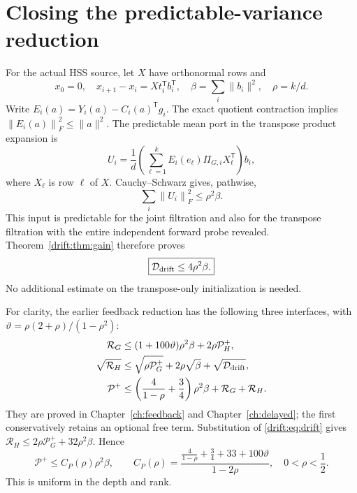 \documentclass[11pt,oneside,openany,a4paper]{book}
\numberwithin{equation}{chapter}
\theoremstyle{definition}
\theoremstyle{remark}
\newcommand{\T}{\mathsf T}\newcommand{\Id}{I}
\newcommand{\F}[1]{\left\lVert#1\right\rVert_F}
\begin{document}
\section{Closing the predictable-variance reduction}

For the actual HSS source, let $X$ have orthonormal rows and
\[
 x_0=0,\quad x_{i+1}-x_i=Xt_i^\T b_i^\T,\quad
 \beta=\sum_i\|b_i\|^2,\quad \rho=k/d.
\]
Write $E_i(a)=Y_i(a)-C_i(a)^\T g_i$. The exact quotient contraction
implies $\F{E_i(a)}^2\le\|a\|^2$. The predictable mean port in the
transpose product expansion is
\[
 U_i=\frac1d\left(\sum_{\ell=1}^k E_i(e_\ell)\Pi_{G,i}X_\ell^\T\right)b_i,
\]
where $X_\ell$ is row $\ell$ of $X$. Cauchy--Schwarz gives, pathwise,
\begin{equation}\label{drift:eq:inputbudget}
 \sum_i\F{U_i}^2\le\rho^2\beta.
\end{equation}
This input is predictable for the joint filtration and also for the
transpose filtration with the entire independent forward probe revealed.
Theorem~\ref{drift:thm:gain} therefore proves
\begin{equation}\label{drift:eq:drift}
 \boxed{\mathcal D_{\rm drift}\le4\rho^2\beta.}
\end{equation}
No additional estimate on the transpose-only initialization is needed.

For clarity, the earlier feedback reduction has the following three
interfaces, with $\vartheta=\rho(2+\rho)/(1-\rho^2)$:
\begin{align*}
 \mathcal R_G&\le(1+100\vartheta)\rho^2\beta+2\rho\mathcal P_H^+,\\
 \sqrt{\mathcal R_H}&\le\sqrt{\rho\mathcal P_G^+}
                         +2\rho\sqrt\beta+\sqrt{\mathcal D_{\rm drift}},\\
 \mathcal P^+&\le\left(\frac4{1-\rho}+\frac34\right)\rho^2\beta
                         +\mathcal R_G+\mathcal R_H.
\end{align*}
They are proved in Chapter~\ref{ch:feedback} and
Chapter~\ref{ch:delayed}; the first conservatively
retains an optional free term. Substitution of \eqref{drift:eq:drift} gives
$\mathcal R_H\le2\rho\mathcal P_G^++32\rho^2\beta$. Hence
\begin{equation}\label{drift:eq:predictable}
 \boxed{\mathcal P^+\le C_P(\rho)\rho^2\beta,\qquad
 C_P(\rho)=\frac{\frac4{1-\rho}+\frac34+33+100\vartheta}{1-2\rho},
 \quad 0<\rho<\frac12.}
\end{equation}
This is uniform in the depth and rank.
\end{document}
